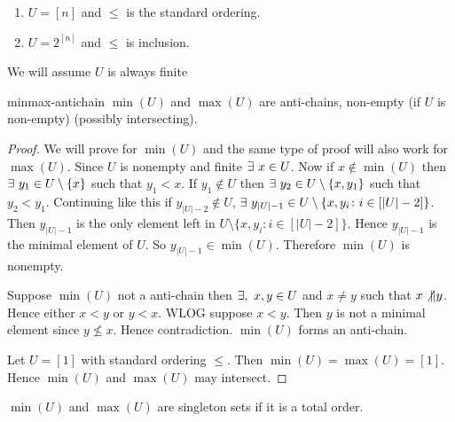 \begin{Example}{}{}
	\begin{enumerate}[label=(\alph*)]
		\item $U=[n]$ and $\leq $ is the standard ordering.
		\item $U=2^{[n]}$ and $\leq $ is inclusion. 
	\end{enumerate}
\end{Example}


\begin{assumption*}
	We will assume $U$ is always finite
\end{assumption*}
\begin{lemma}{}{minmax-antichain}
	$\min (U)$ and $\max{(U)}$ are anti-chains, non-empty (if $U$ is non-empty) (possibly intersecting).
\end{lemma}
\begin{proof}
	We will prove for $\min(U)$ and the same type of proof will also work for $\max(U)$. Since $U$ is nonempty and finite $\exists \ x\in U$. Now if $x\notin \min(U)$ then $\exists\ y_1\in U\setminus\{x\}$ such that $y_1<x$. If $y_1\notin U$ then $\exists\ y_2\in U\setminus\{x,y_1\}$ such that $y_2<y_1$. Continuing like this if $y_{|U|-2}\notin U$, $\exists\ y_{|U|-1}\in U\setminus\{x,y_i\colon i\in[|U|-2]\}$. Then $y_{|U|-1}$ is the only element left in $U\setminus\{x,y_i\colon i\in[|U|-2]\}$. Hence $y_{|U|-1}$ is the minimal element of $U$. So $y_{|U|-1}\in \min(U)$. Therefore $\min(U)$ is nonempty.
	
	 Suppose $\min(U)$  not a anti-chain then $\exists,\ x,y\in U$ and $x\neq y$ such that $x\not\| y$. Hence either $x<y$ or $y<x$. WLOG suppose $x<y$. Then $y$ is not a minimal element since $y\not\leq x$. Hence contradiction. $\min(U)$ forms an anti-chain.
	 
	 Let $U=[1]$ with standard ordering $\leq$. Then $\min(U)=\max(U)=[1]$. Hence $\min(U)$ and $\max(U)$ may intersect. 
\end{proof}
\begin{observation*}
	$\min(U)$ and $\max(U)$ are singleton sets  if it is a total order. 
\end{observation*}

